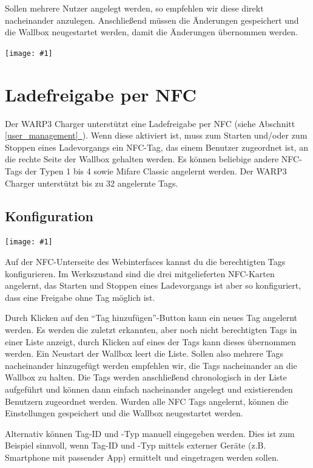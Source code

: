 \documentclass[a4paper,10pt]{article}
\newcommand{\gfx}[1]{\texttt{[image: \#1]}}
\newcommand*{\fullref}[1]{Abschnitt \hyperref[{#1}]{\ref*{#1}~\nameref*{#1}}}
\begin{document}
\begin{multicols*}{2}
    Sollen mehrere Nutzer angelegt werden, so empfehlen wir diese direkt
    nacheinander anzulegen. Anschließend müssen die Änderungen gespeichert und
    die Wallbox neugestartet werden, damit die Änderungen übernommen werden.

    \gfx{./img_warp2/resized/web_users}

    \newpage
    \section{Ladefreigabe per NFC}
    \label{NFC}
    Der WARP3 Charger unterstützt eine Ladefreigabe per NFC (siehe \fullref{user_management}).
    Wenn diese aktiviert ist,
    muss zum Starten und/oder zum Stoppen eines Ladevorgangs ein NFC-Tag, das einem Benutzer zugeordnet ist, an die rechte Seite
    der Wallbox gehalten werden. Es können beliebige andere NFC-Tags der Typen 1 bis 4
    sowie Mifare Classic angelernt werden. Der WARP3 Charger unterstützt bis zu 32 angelernte Tags.

    \vspace*{-0.1cm}

    \subsection{Konfiguration}
    \gfx{./img_warp2/resized/web_nfc}

    Auf der NFC-Unterseite des Webinterfaces kannst du die berechtigten Tags konfigurieren.
    Im Werkszustand sind die drei mitgelieferten NFC-Karten angelernt,
    das Starten und Stoppen eines Ladevorgangs ist aber so konfiguriert, dass eine
    Freigabe ohne Tag möglich ist.

    Durch Klicken auf den \enquote{Tag hinzufügen}-Button kann ein neues Tag angelernt werden.
    Es werden die zuletzt erkannten, aber noch nicht berechtigten Tags in einer
    Liste anzeigt, durch Klicken auf eines der Tags kann dieses übernommen werden. Ein Neustart der
    Wallbox leert die Liste. Sollen also mehrere Tags nacheinander hinzugefügt
    werden empfehlen wir, die Tags nacheinander an die Wallbox zu halten. Die
    Tags werden anschließend chronologisch in der Liste aufgeführt und können
    dann einfach nacheinander angelegt und existierenden Benutzern zugeordnet
    werden. Wurden alle NFC Tags angelernt, können die Einstellungen gespeichert und die
    Wallbox neugestartet werden.

    Alternativ können Tag-ID und -Typ manuell eingegeben werden. Dies ist zum Beispiel sinnvoll,
    wenn Tag-ID und -Typ mittels externer Geräte (z.B. Smartphone mit passender
    App) ermittelt und eingetragen werden sollen.


\end{multicols*}
\end{document}
